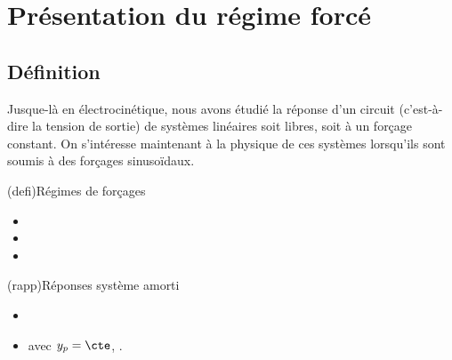 \documentclass[../../main/main.tex]{subfiles}
\begin{document}
\vspace*{\fill}

\newpage

\section{Présentation du régime forcé}
\subsection{Définition}

Jusque-là en électrocinétique, nous avons étudié la réponse d'un circuit
(c'est-à-dire la tension de sortie) de systèmes linéaires soit libres, soit à un
forçage constant. On s'intéresse maintenant à la physique de ces systèmes
lorsqu'ils sont soumis à des forçages sinusoïdaux.

\begin{tcb}(defi){Régimes de forçages}
	\begin{itemize}
		\item {}%
		      \vspace{-15pt}
		\item {}%
		      \vspace{-15pt}
		\item {}%
	\end{itemize}
\end{tcb}

\begin{tcb}(rapp){Réponses système amorti}
	\begin{itemize}
		\item
		\item
		      \smallbreak
		      avec $y_p = \cte$, .
	\end{itemize}
\end{tcb}
\end{document}
